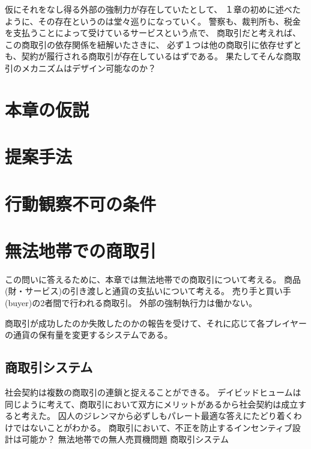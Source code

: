 仮にそれをなし得る外部の強制力が存在していたとして、
１章の初めに述べたように、その存在というのは堂々巡りになっていく。
警察も、裁判所も、税金を支払うことによって受けているサービスという点で、
商取引だと考えれば、この商取引の依存関係を紐解いたさきに、
必ず１つは他の商取引に依存せずとも、契約が履行される商取引が存在しているはずである。
果たしてそんな商取引のメカニズムはデザイン可能なのか？

\section{本章の仮説}

\section{提案手法}

\section{行動観察不可の条件}

\section{無法地帯での商取引}
この問いに答えるために、本章では無法地帯での商取引について考える。
商品(財・サービス)の引き渡しと通貨の支払いについて考える。
売り手と買い手(buyer)の2者間で行われる商取引。
外部の強制執行力は働かない。

商取引が成功したのか失敗したのかの報告を受けて、それに応じて各プレイヤーの通貨の保有量を変更するシステムである。

\subsection{商取引システム}


% 
% 
% 





社会契約は複数の商取引の連鎖と捉えることができる。
デイビッドヒュームは同じように考えて、商取引において双方にメリットがあるから社会契約は成立すると考えた。
囚人のジレンマから必ずしもパレート最適な答えにたどり着くわけではないことがわかる。
商取引において、不正を防止するインセンティブ設計は可能か？
無法地帯での無人売買機問題
商取引システム